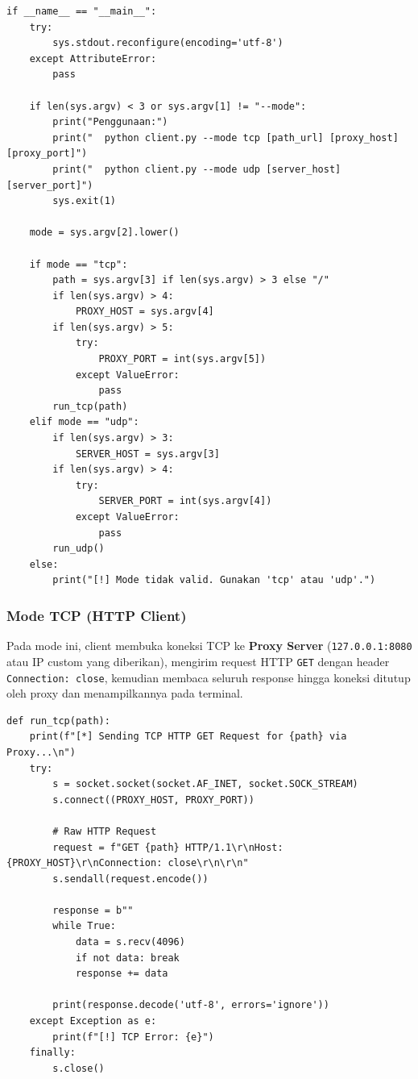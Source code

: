 \documentclass[11pt,a4paper]{article}
\begin{document}
\begin{lstlisting}[caption={Entry point dan pemilihan mode pada \texttt{client.py}}, label={lst:client-main}]
if __name__ == "__main__":
    try:
        sys.stdout.reconfigure(encoding='utf-8')
    except AttributeError:
        pass
        
    if len(sys.argv) < 3 or sys.argv[1] != "--mode":
        print("Penggunaan:")
        print("  python client.py --mode tcp [path_url] [proxy_host] [proxy_port]")
        print("  python client.py --mode udp [server_host] [server_port]")
        sys.exit(1)

    mode = sys.argv[2].lower()

    if mode == "tcp":
        path = sys.argv[3] if len(sys.argv) > 3 else "/"
        if len(sys.argv) > 4:
            PROXY_HOST = sys.argv[4]
        if len(sys.argv) > 5:
            try:
                PROXY_PORT = int(sys.argv[5])
            except ValueError:
                pass
        run_tcp(path)
    elif mode == "udp":
        if len(sys.argv) > 3:
            SERVER_HOST = sys.argv[3]
        if len(sys.argv) > 4:
            try:
                SERVER_PORT = int(sys.argv[4])
            except ValueError:
                pass
        run_udp()
    else:
        print("[!] Mode tidak valid. Gunakan 'tcp' atau 'udp'.")
\end{lstlisting}

\subsubsection{Mode TCP (HTTP Client)}

Pada mode ini, client membuka koneksi TCP ke \textbf{Proxy Server} (\texttt{127.0.0.1:8080} atau IP custom yang diberikan), mengirim request HTTP \texttt{GET} dengan header \texttt{Connection: close}, kemudian membaca seluruh response hingga koneksi ditutup oleh proxy dan menampilkannya pada terminal.

\begin{lstlisting}[caption={Mode TCP pada \texttt{client.py}}, label={lst:client-tcp}]
def run_tcp(path):
    print(f"[*] Sending TCP HTTP GET Request for {path} via Proxy...\n")
    try:
        s = socket.socket(socket.AF_INET, socket.SOCK_STREAM)
        s.connect((PROXY_HOST, PROXY_PORT))

        # Raw HTTP Request
        request = f"GET {path} HTTP/1.1\r\nHost: {PROXY_HOST}\r\nConnection: close\r\n\r\n"
        s.sendall(request.encode())

        response = b""
        while True:
            data = s.recv(4096)
            if not data: break
            response += data

        print(response.decode('utf-8', errors='ignore'))
    except Exception as e:
        print(f"[!] TCP Error: {e}")
    finally:
        s.close()
\end{lstlisting}
\end{document}
